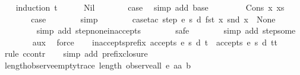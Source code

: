 \begin{isabellebody}
%
\isadelimproof
\ \ %
\endisadelimproof
%
\isatagproof
{}\isamarkupfalse%
\ {\isacharparenleft}induction\ {\isachardoublequoteopen}t{\isachardoublequoteclose}{\isacharparenright}\isanewline
\ \ \ \ \isamarkupfalse%
\ Nil\isanewline
\ \ \ \ \isamarkupfalse%
\ \isamarkupfalse%
\ {\isacharquery}case\ \isamarkupfalse%
\ {\isacharparenleft}simp\ add{\isacharcolon}\ base{\isacharparenright}\isanewline
\ \ \isamarkupfalse%
\isanewline
\ \ \ \ \isamarkupfalse%
\ {\isacharparenleft}Cons\ x\ xs{\isacharparenright}\isanewline
\ \ \ \ \isamarkupfalse%
\ \isamarkupfalse%
\ {\isacharquery}case\isanewline
\ \ \ \ \ \ \isamarkupfalse%
\ simp\isanewline
\ \ \ \ \ \ \isamarkupfalse%
\ {\isacharparenleft}case{\isacharunderscore}tac\ {\isachardoublequoteopen}step\ e\ s\ d\ {\isacharparenleft}fst\ x{\isacharparenright}\ {\isacharparenleft}snd\ x{\isacharparenright}\ {\isacharequal}\ None{\isachardoublequoteclose}{\isacharparenright}\isanewline
\ \ \ \ \ \ \ \isamarkupfalse%
\ {\isacharparenleft}simp\ add{\isacharcolon}\ step{\isacharunderscore}none{\isacharunderscore}inaccepts{\isacharparenright}\isanewline
\ \ \ \ \ \ \isamarkupfalse%
\ safe\isanewline
\ \ \ \ \ \ \isamarkupfalse%
\ {\isacharparenleft}simp\ add{\isacharcolon}\ step{\isacharunderscore}some{\isacharparenright}\isanewline
\ \ \ \ \ \ \isamarkupfalse%
\ aux{}\ \isamarkupfalse%
\ force\isanewline
\ \ \isamarkupfalse%
%
\endisatagproof
{\isafoldproof}%
%
\isadelimproof
\isanewline
%
\endisadelimproof
\isanewline
{}\isamarkupfalse%
\ inaccepts{\isacharunderscore}prefix{\isacharcolon}\ {\isachardoublequoteopen}{\isasymnot}accepts\ e\ s\ d\ t\ {\isasymLongrightarrow}\ {\isasymnot}accepts\ e\ s\ d\ {\isacharparenleft}t{\isacharat}t{\isacharprime}{\isacharparenright}{\isachardoublequoteclose}\isanewline
%
\isadelimproof
\ \ %
\endisadelimproof
%
\isatagproof
{}\isamarkupfalse%
\ {\isacharparenleft}rule\ ccontr{\isacharparenright}\isanewline
\ \ \isamarkupfalse%
\ {\isacharparenleft}simp\ add{\isacharcolon}\ prefix{\isacharunderscore}closure{\isacharparenright}%
\endisatagproof
{\isafoldproof}%
%
\isadelimproof
\isanewline
%
\endisadelimproof
\isanewline
{}\isamarkupfalse%
\ length{\isacharunderscore}observe{\isacharunderscore}empty{\isacharunderscore}trace{\isacharcolon}\ {\isachardoublequoteopen}length\ {\isacharparenleft}observe{\isacharunderscore}all\ e\ aa\ b\ {\isacharbrackleft}{\isacharbrackright}{\isacharparenright}\ {\isacharequal}\ {}{\isachardoublequoteclose}\isanewline

\end{isabellebody}
